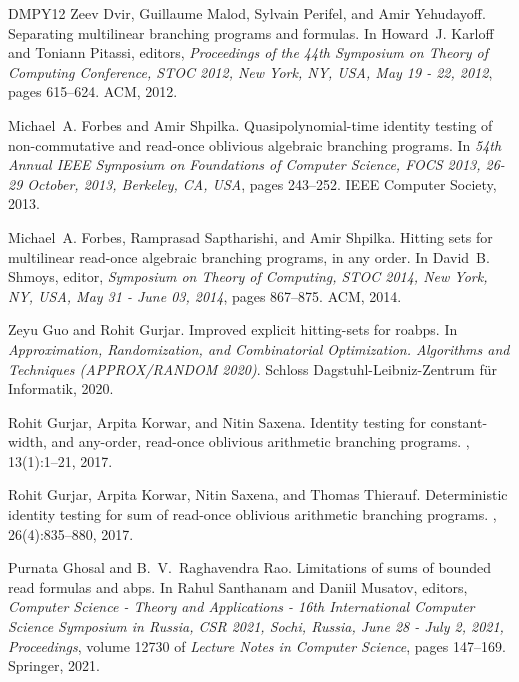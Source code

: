 \documentclass[10pt,a4paper]{article}
\theoremstyle{definition}%
\theoremstyle{plain}
\begin{document}
\begin{thebibliography}{DMPY12}
Zeev Dvir, Guillaume Malod, Sylvain Perifel, and Amir Yehudayoff.
\newblock Separating multilinear branching programs and formulas.
\newblock In Howard~J. Karloff and Toniann Pitassi, editors, {\em Proceedings
  of the 44th Symposium on Theory of Computing Conference, {STOC} 2012, New
  York, NY, USA, May 19 - 22, 2012}, pages 615--624. {ACM}, 2012.

Michael~A. Forbes and Amir Shpilka.
\newblock Quasipolynomial-time identity testing of non-commutative and
  read-once oblivious algebraic branching programs.
\newblock In {\em 54th Annual {IEEE} Symposium on Foundations of Computer
  Science, {FOCS} 2013, 26-29 October, 2013, Berkeley, CA, {USA}}, pages
  243--252. {IEEE} Computer Society, 2013.

Michael~A. Forbes, Ramprasad Saptharishi, and Amir Shpilka.
\newblock Hitting sets for multilinear read-once algebraic branching programs,
  in any order.
\newblock In David~B. Shmoys, editor, {\em Symposium on Theory of Computing,
  {STOC} 2014, New York, NY, USA, May 31 - June 03, 2014}, pages 867--875.
  {ACM}, 2014.

Zeyu Guo and Rohit Gurjar.
\newblock Improved explicit hitting-sets for roabps.
\newblock In {\em Approximation, Randomization, and Combinatorial Optimization.
  Algorithms and Techniques (APPROX/RANDOM 2020)}. Schloss
  Dagstuhl-Leibniz-Zentrum f{\"u}r Informatik, 2020.

Rohit Gurjar, Arpita Korwar, and Nitin Saxena.
\newblock Identity testing for constant-width, and any-order, read-once
  oblivious arithmetic branching programs.
, 13(1):1--21, 2017.

Rohit Gurjar, Arpita Korwar, Nitin Saxena, and Thomas Thierauf.
\newblock Deterministic identity testing for sum of read-once oblivious
  arithmetic branching programs.
, 26(4):835--880, 2017.

Purnata Ghosal and B.~V.~Raghavendra Rao.
\newblock Limitations of sums of bounded read formulas and abps.
\newblock In Rahul Santhanam and Daniil Musatov, editors, {\em Computer Science
  - Theory and Applications - 16th International Computer Science Symposium in
  Russia, {CSR} 2021, Sochi, Russia, June 28 - July 2, 2021, Proceedings},
  volume 12730 of {\em Lecture Notes in Computer Science}, pages 147--169.
  Springer, 2021.


\end{thebibliography}
\end{document}
